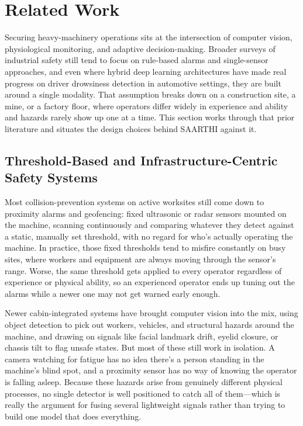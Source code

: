 \section{Related Work}
Securing heavy-machinery operations sits at the intersection of computer vision, physiological monitoring, and adaptive decision-making. Broader surveys of industrial safety still tend to focus on rule-based alarms and single-sensor approaches, and even where hybrid deep learning architectures have made real progress on driver drowsiness detection in automotive settings, they are built around a single modality. That assumption breaks down on a construction site, a mine, or a factory floor, where operators differ widely in experience and ability and hazards rarely show up one at a time. This section works through that prior literature and situates the design choices behind SAARTHI against it.

\subsection{Threshold-Based and Infrastructure-Centric Safety Systems}
Most collision-prevention systems on active worksites still come down to proximity alarms and geofencing: fixed ultrasonic or radar sensors mounted on the machine, scanning continuously and comparing whatever they detect against a static, manually set threshold, with no regard for who's actually operating the machine. In practice, those fixed thresholds tend to misfire constantly on busy sites, where workers and equipment are always moving through the sensor's range. Worse, the same threshold gets applied to every operator regardless of experience or physical ability, so an experienced operator ends up tuning out the alarms while a newer one may not get warned early enough.

Newer cabin-integrated systems have brought computer vision into the mix, using object detection to pick out workers, vehicles, and structural hazards around the machine, and drawing on signals like facial landmark drift, eyelid closure, or chassis tilt to flag unsafe states. But most of these still work in isolation. A camera watching for fatigue has no idea there's a person standing in the machine's blind spot, and a proximity sensor has no way of knowing the operator is falling asleep. Because these hazards arise from genuinely different physical processes, no single detector is well positioned to catch all of them---which is really the argument for fusing several lightweight signals rather than trying to build one model that does everything.

